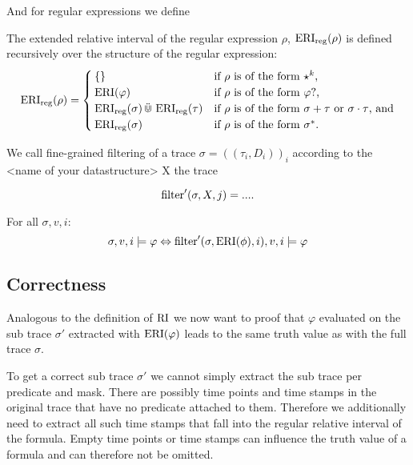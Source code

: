 And for regular expressions we define 
\begin{definition}
    \label{def:e-rel-int-reg}
    The extended relative interval of the regular expression $\rho$, $\operatorname{ERI}_{\text{reg}}(\rho)$ is defined recursively over the structure of the regular expression:
    \begin{equation*}
        \operatorname{ERI}_{\text{reg}}(\rho) =
        \begin{cases}
            \{\} & \text{if $\rho$ is of the form $\star^k$,} \\
            \operatorname{ERI}(\varphi) & \text{if $\rho$ is of the form $\varphi ?$,} \\
            \operatorname{ERI}_{\text{reg}}(\sigma) \,\ddot{\Cup}\, \operatorname{ERI}_{\text{reg}}(\tau) & \text{if $\rho$ is of the form $\sigma + \tau$ or $\sigma \cdot \tau$, and} \\
            \operatorname{ERI}_{\text{reg}}(\sigma) & \text{if $\rho$ is of the form $\sigma^*$.}
        \end{cases}
    \end{equation*}
\end{definition}

\begin{definition}
    \label{def:e-filter}
    We call fine-grained filtering of a trace $\sigma=((\tau_i,D_i))_i$ according to the <name of your datastructure> X the trace 
    
    \begin{equation*}
        \operatorname{filter}'(\sigma, X, j) = ....
    \end{equation*}
\end{definition} 

\begin{theorem}
    \label{theo:e-filter-correctness}
    For all $\sigma, v, i$:
    \begin{equation*}
        \sigma, v, i \models \varphi 
        \Leftrightarrow \operatorname{filter}'(\sigma, \operatorname{ERI}(\phi), i), v, i \models \varphi
    \end{equation*}
\end{theorem} 

\subsection{Correctness}
Analogous to the definition of $\operatorname{RI}$ we now want to proof that $\varphi$ evaluated on the sub trace $\sigma'$ extracted with $\operatorname{ERI}(\varphi)$ leads to the same truth value as with the full trace $\sigma$.

To get a correct sub trace $\sigma'$ we cannot simply extract the sub trace per predicate and mask.
There are possibly time points and time stamps in the original trace that have no predicate attached to them.
Therefore we additionally need to extract all such time stamps that fall into the regular relative interval of the formula.
Empty time points or time stamps can influence the truth value of a formula and can therefore not be omitted.

